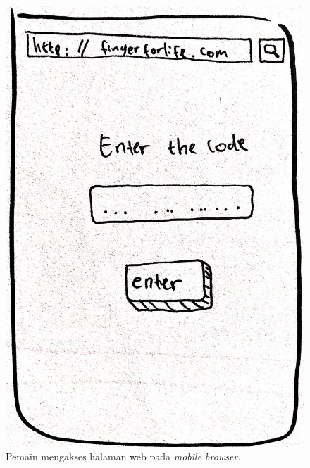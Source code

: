 \documentclass[a4paper,twoside]{article}
\begin{document}
\begin{enumerate}
		\begin{figure}[H]
			\centering
			\includegraphics[scale=0.1]{Gambar/mob1_home1}
			\caption{Pemain mengakses halaman web pada \textit{mobile browser}.}
			\label{fig:10_mob1_home1}
		\end{figure}
	

\end{enumerate}
\end{document}
